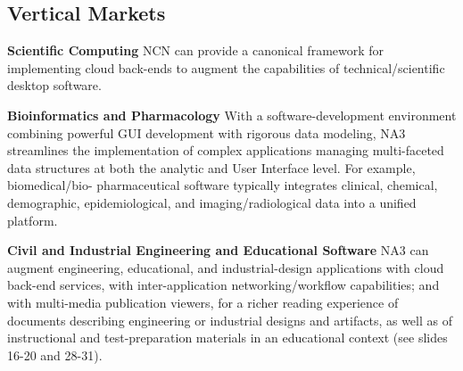 
\begin{frame}{}
\section{Vertical Markets}

\vspace{8pt}
{\thrulex}

{\fontsize{17}{16}\selectfont
\hspace*{15pt}\begin{minipage}{.99\textwidth}
\vspace{-14pt}



		

{\setlength{\leftmargini}{3pt}\begin{enumerate}
\dmitem \textbf{Scientific Computing} \hspace{.5em} 
NCN can provide a canonical framework for 
implementing cloud back-ends to augment 
the capabilities of technical/scientific 
desktop software.
\vspace{14pt}


\dmitem \textbf{Bioinformatics and Pharmacology}  \hspace{.5em} 
With a software-development environment 
combining powerful GUI development with 
rigorous data modeling, NA3 streamlines 
the implementation of complex applications 
managing multi-faceted data structures 
at both the analytic and User Interface 
level.  For example, biomedical/bio- pharmaceutical 
software typically integrates 
clinical, chemical, demographic, epidemiological, 
and imaging/radiological data into a unified 
platform.
\vspace{14pt}

\dmitem \textbf{Civil and Industrial Engineering and 
Educational Software}  \hspace{.5em} 
NA3 can augment engineering, educational, and 
industrial-design applications with cloud back-end 
services, with inter-application 
networking/workflow capabilities; and with 
multi-media publication viewers, for 
a richer reading experience of documents 
describing engineering or industrial 
designs and artifacts, as well as of 
instructional and test-preparation 
materials in an educational context 
(see slides 16-20 and 28-31).


\end{enumerate}}
\end{minipage}}
\end{frame}
